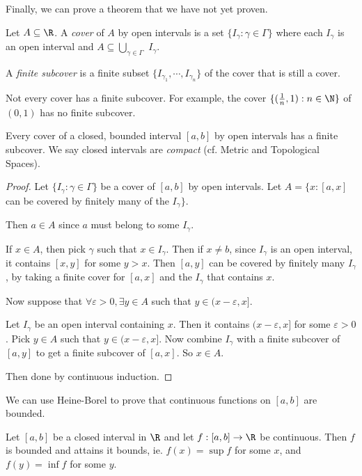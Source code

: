 \documentclass[a4paper]{article}
\begin{document}
Finally, we can prove a theorem that we have not yet proven.
\begin{defi}
  Let $A\subseteq \R$. A \emph{cover} of $A$ by open intervals is a set $\{I_\gamma: \gamma\in \Gamma\}$ where each $I_\gamma$ is an open interval and $A \subseteq \bigcup_{\gamma\in \Gamma}$ $I_\gamma$.

  A \emph{finite subcover} is a finite subset $\{I_{\gamma_1}, \cdots, I_{\gamma_n}\}$ of the cover that is still a cover.
\end{defi}

Not every cover has a finite subcover. For example, the cover $\{(\frac{1}{n}, 1): n\in \N\}$ of $(0, 1)$ has no finite subcover.

\begin{thm}
  Every cover of a closed, bounded interval $[a, b]$ by open intervals has a finite subcover. We say closed intervals are \emph{compact} (cf. Metric and Topological Spaces).
\end{thm}

\begin{proof}
  Let $\{I_\gamma: \gamma\in \Gamma\}$ be a cover of $[a, b]$ by open intervals. Let $A = \{x: [a, x]$ can be covered by finitely many of the $I_\gamma\}$.

  Then $a\in A$ since $a$ must belong to some $I_\gamma$.

  If $x\in A$, then pick $\gamma$ such that $x\in I_\gamma$. Then if $x\not = b$, since $I_\gamma$ is an open interval, it contains $[x, y]$ for some $y > x$. Then $[a, y]$ can be covered by finitely many $I_\gamma$, by taking a finite cover for $[a, x]$ and the $I_\gamma$ that contains $x$.

  Now suppose that $\forall \varepsilon > 0, \exists y\in A$ such that $y\in (x - \varepsilon, x]$.

  Let $I_\gamma$ be an open interval containing $x$. Then it contains $(x - \varepsilon, x]$ for some $\varepsilon > 0$. Pick $y\in A$ such that $y\in (x - \varepsilon, x]$. Now combine $I_\gamma$ with a finite subcover of $[a, y]$ to get a finite subcover of $[a, x]$. So $x\in A$.

  Then done by continuous induction.
\end{proof}

We can use Heine-Borel to prove that continuous functions on $[a, b]$ are bounded.

\begin{thm}
  Let $[a, b]$ be a closed interval in $\R$ and let $f: [a, b] \to \R$ be continuous. Then $f$ is bounded and attains it bounds, ie. $f(x) = \sup f$ for some $x$, and $f(y) = \inf f$ for some $y$.
\end{thm}
\end{document}
